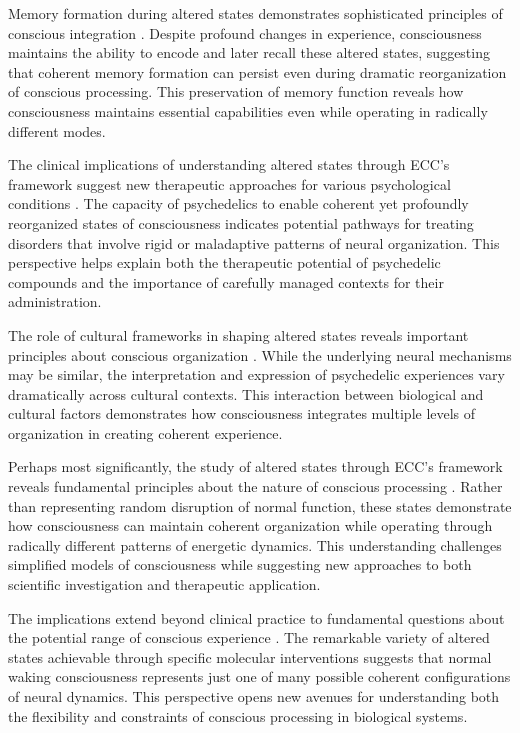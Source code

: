 \begin{refsection}
Memory formation during altered states demonstrates sophisticated principles of conscious integration \cite{Hobson2007}. Despite profound changes in experience, consciousness maintains the ability to encode and later recall these altered states, suggesting that coherent memory formation can persist even during dramatic reorganization of conscious processing. This preservation of memory function reveals how consciousness maintains essential capabilities even while operating in radically different modes.

The clinical implications of understanding altered states through ECC's framework suggest new therapeutic approaches for various psychological conditions \cite{Vollenweider2020}. The capacity of psychedelics to enable coherent yet profoundly reorganized states of consciousness indicates potential pathways for treating disorders that involve rigid or maladaptive patterns of neural organization. This perspective helps explain both the therapeutic potential of psychedelic compounds and the importance of carefully managed contexts for their administration.

The role of cultural frameworks in shaping altered states reveals important principles about conscious organization \cite{Winkelman2010}. While the underlying neural mechanisms may be similar, the interpretation and expression of psychedelic experiences vary dramatically across cultural contexts. This interaction between biological and cultural factors demonstrates how consciousness integrates multiple levels of organization in creating coherent experience.

Perhaps most significantly, the study of altered states through ECC's framework reveals fundamental principles about the nature of conscious processing \cite{Preller2018}. Rather than representing random disruption of normal function, these states demonstrate how consciousness can maintain coherent organization while operating through radically different patterns of energetic dynamics. This understanding challenges simplified models of consciousness while suggesting new approaches to both scientific investigation and therapeutic application.

The implications extend beyond clinical practice to fundamental questions about the potential range of conscious experience \cite{Wulff2014}. The remarkable variety of altered states achievable through specific molecular interventions suggests that normal waking consciousness represents just one of many possible coherent configurations of neural dynamics. This perspective opens new avenues for understanding both the flexibility and constraints of conscious processing in biological systems.


\end{refsection}

